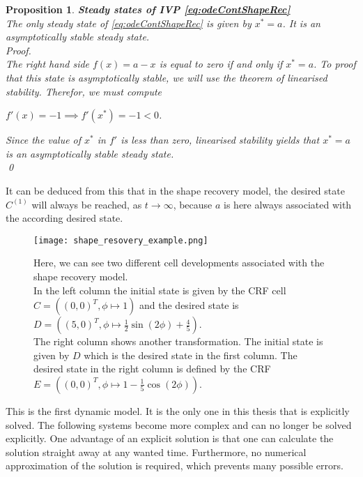 \documentclass[a4paper,12pt,leqno]{article}
\theoremstyle{plain}
\newtheorem{proposition}[theorem]{Proposition}
\theoremstyle{remark}
\begin{document}
\begin{proposition} \textbf{Steady states of IVP \eqref{eq:odeContShapeRec}} \\
	The only steady state of \eqref{eq:odeContShapeRec} is given by $x^\ast = a$. It is an asymptotically stable steady state. \\
	Proof. \\
	The right hand side $f(x) = a - x$ is equal to zero if and only if $x^\ast = a$. 
	To proof that this state is asymptotically stable, we will use the theorem of linearised stability. Therefor, we must compute
	\begin{center}
		$f'(x) = -1 \implies f'(x^\ast) = -1 < 0$. 
	\end{center}
	Since the value of $x^\ast$ in $f'$ is less than zero, linearised stability yields that  $x^\ast = a$ is an asymptotically stable steady state. \\
	\qed 	
\end{proposition}
It can be deduced from this that in the shape recovery model, the desired state $C^{(1)}$ will always be reached, as $t \rightarrow \infty$, because $a$ is here always associated with the according desired state. 
\begin{figure}
	\centering
	\texttt{[image: shape\_resovery\_example.png]}
	\caption{Here, we can see two different cell developments associated with the shape recovery model. \\
	In the left column the initial state is given by the CRF cell $ C = ( (0, 0)^T, \phi \mapsto 1)$ and the desired state is $D = ( (5, 0)^T,  \phi \mapsto \frac{1}{2} \sin(2 \phi) + \frac{4}{5})$. \\
	The right column shows another transformation. The initial state is given by $D$ which is the desired state in the first column. The desired state in the right column is defined by the CRF $E = ((0, 0)^T, \phi \mapsto 1 - \frac{1}{5} \cos(2 \phi))$.}
	\label{fig:shapeRec}
\end{figure}
This is the first dynamic model. It is the only one in this thesis that is explicitly solved. The following systems become more complex and can no longer be solved explicitly. One advantage of an explicit solution is that one can calculate the solution straight away at any wanted time. Furthermore, no numerical approximation of the solution is required, which prevents many possible errors.



\newpage
\end{document}
